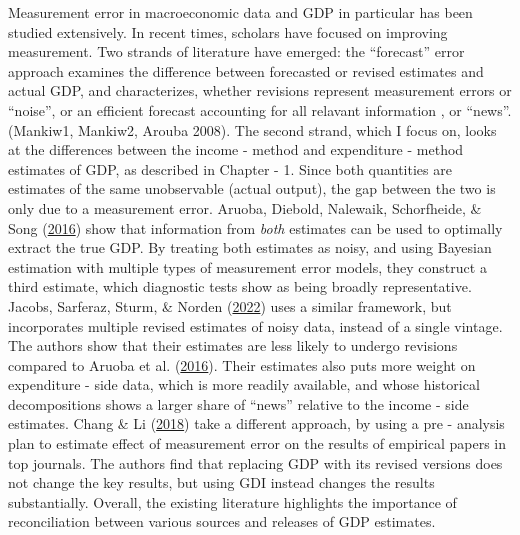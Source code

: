 \documentclass[12pt,nobind, a4paper]{reedthesis}
\begin{document}
 Measurement error in macroeconomic data and GDP in particular has been studied extensively. In recent times, scholars have focused on improving measurement. Two strands of literature have emerged: the ``forecast'' error approach examines the difference between forecasted or revised estimates and actual GDP, and characterizes, whether revisions represent measurement errors or ``noise'', or an efficient forecast accounting for all relavant information , or ``news''. (Mankiw1, Mankiw2, Arouba 2008). The second strand, which I focus on, looks at the differences between the income - method and expenditure - method estimates of GDP, as described in Chapter - 1. Since both quantities are estimates of the same unobservable (actual output), the gap between the two is only due to a measurement error. Aruoba, Diebold, Nalewaik, Schorfheide, \& Song (\protect\hyperlink{ref-aruoba_improving_2016}{2016}) show that information from \emph{both} estimates can be used to optimally extract the true GDP. By treating both estimates as noisy, and using Bayesian estimation with multiple types of measurement error models, they construct a third estimate, which diagnostic tests show as being broadly representative. Jacobs, Sarferaz, Sturm, \& Norden (\protect\hyperlink{ref-jacobs_can_2022}{2022}) uses a similar framework, but incorporates multiple revised estimates of noisy data, instead of a single vintage. The authors show that their estimates are less likely to undergo revisions compared to Aruoba et al. (\protect\hyperlink{ref-aruoba_improving_2016}{2016}). Their estimates also puts more weight on expenditure - side data, which is more readily available, and whose historical decompositions shows a larger share of ``news'' relative to the income - side estimates. Chang \& Li (\protect\hyperlink{ref-chang_measurement_2018}{2018}) take a different approach, by using a pre - analysis plan to estimate effect of measurement error on the results of empirical papers in top journals. The authors find that replacing GDP with its revised versions does not change the key results, but using GDI instead changes the results substantially. Overall, the existing literature highlights the importance of reconciliation between various sources and releases of GDP estimates.
 \linebreak
\end{document}
